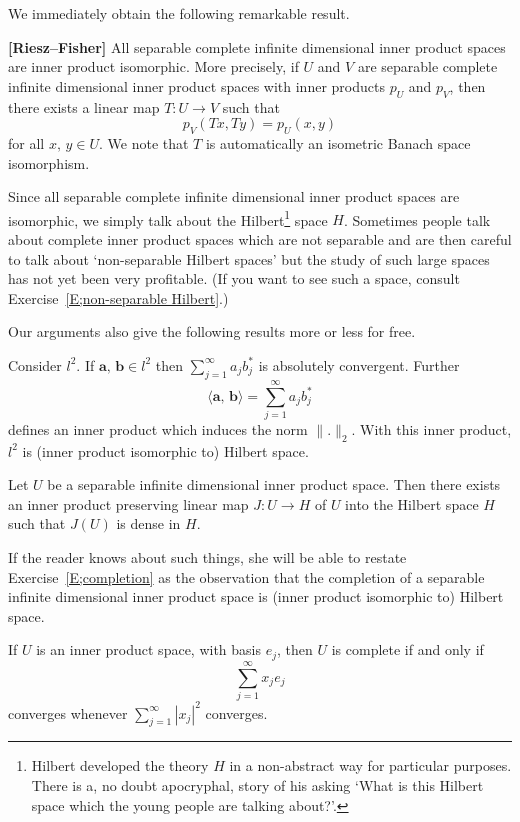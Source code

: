 We immediately obtain the following remarkable result.
\begin{theorem} {\bf [Riesz--Fisher]} All separable
complete infinite dimensional inner product spaces are inner
product isomorphic. 
More precisely, if $U$ and $V$
are separable complete infinite dimensional
inner product spaces with inner products $p_{U}$ and $p_{V}$,
then there exists a linear map $T:U\rightarrow V$
such that
\[p_{V}(Tx,Ty)=p_{U}(x,y)\]
for all $x,\,y\in U$. We note that $T$ is automatically an
isometric Banach space isomorphism.
\end{theorem}
Since all separable
complete infinite dimensional inner product spaces
are isomorphic, we simply talk about the 
Hilbert\footnote{Hilbert developed the theory 
$H$ in a non-abstract way for particular purposes. 
There is a, no doubt
apocryphal, story of his asking `What is this Hilbert space
which the young people are talking about?'.} space $H$.
Sometimes people talk about complete inner product
spaces which are not separable and are then careful
to talk about `non-separable Hilbert spaces' but
the study of such large 
spaces has not yet been very profitable. 
(If you want to see such a space, 
consult Exercise~\ref{E;non-separable Hilbert}.)
 
Our arguments also give the following results
more or less for free.
\begin{exercise} Consider $l^{2}$. If ${\mathbf a},\,{\mathbf b}\in l^{2}$
then $\sum_{j=1}^{\infty}a_{j}b_{j}^{*}$ is 
absolutely convergent. Further
\[\langle {\mathbf a},\,{\mathbf b}\rangle=\sum_{j=1}^{\infty}a_{j}b_{j}^{*}\]
defines an inner product which induces the norm $\|.\|_{2}$.
With this inner product, $l^{2}$ is (inner product isomorphic to)
Hilbert space.
\end{exercise}
\begin{exercise}\label{E;completion} Let $U$ be a
separable infinite dimensional
inner product space.
Then there exists an inner product preserving 
linear map
$J:U\rightarrow H$ of $U$ into the Hilbert space $H$
such that $J(U)$ is dense in $H$.
\end{exercise}
If the reader knows about such things, she will be able to
restate Exercise~\ref{E;completion} as the observation that
the completion of a separable infinite dimensional
inner product space is (inner product isomorphic to)
Hilbert space. 
\begin{lemma} If $U$ is an inner product space,
with basis $e_{j}$,
then $U$ is complete if and only if
\[\sum_{j=1}^{\infty}x_{j}e_{j}\]
converges whenever $\sum_{j=1}^{\infty}|x_{j}|^{2}$ converges.
\end{lemma}
